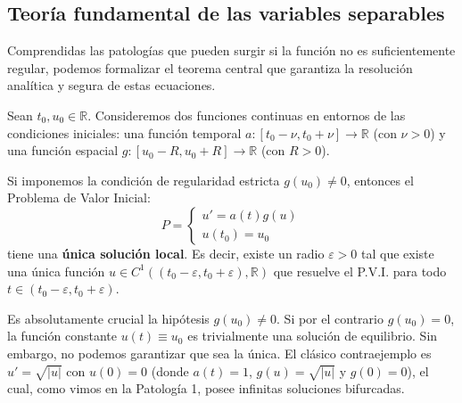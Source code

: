 \subsection{Teoría fundamental de las variables separables}

Comprendidas las patologías que pueden surgir si la función no es suficientemente regular, podemos formalizar el teorema central que garantiza la resolución analítica y segura de estas ecuaciones.

\begin{teorema} 
    Sean $t_0, u_0 \in \mathbb{R}$. Consideremos dos funciones continuas en entornos de las condiciones iniciales: una función temporal $a : [t_0 - \nu, t_0 + \nu] \to \mathbb{R}$ (con $\nu > 0$) y una función espacial $g : [u_0 - R, u_0 + R] \to \mathbb{R}$ (con $R > 0$). 
    
    Si imponemos la condición de regularidad estricta $g(u_0) \neq 0$, entonces el Problema de Valor Inicial:
    \[
        P = \begin{cases}
            u' = a(t) g(u) \\
            u(t_0) = u_0
        \end{cases}
    \]
    tiene una \textbf{única solución local}. Es decir, existe un radio $\varepsilon > 0$ tal que existe una única función $u \in C^1((t_0 - \varepsilon, t_0 + \varepsilon), \mathbb{R})$ que resuelve el P.V.I. para todo $t \in (t_0 - \varepsilon, t_0 + \varepsilon)$.
\end{teorema}

\begin{observación}
    Es absolutamente crucial la hipótesis $g(u_0) \neq 0$. Si por el contrario $g(u_0) = 0$, la función constante $u(t) \equiv u_0$ es trivialmente una solución de equilibrio. Sin embargo, no podemos garantizar que sea la única. El clásico contraejemplo es $u' = \sqrt{|u|}$ con $u(0) = 0$ (donde $a(t)=1$, $g(u) = \sqrt{|u|}$ y $g(0)=0$), el cual, como vimos en la Patología 1, posee infinitas soluciones bifurcadas.
\end{observación}

